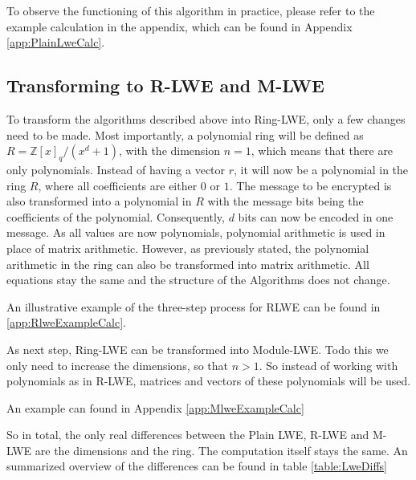 To observe the functioning of this algorithm in practice, please refer to the example calculation in the appendix, which can be found in Appendix \ref{app:PlainLweCalc}.

\subsection*{Transforming to R-LWE and M-LWE}

To transform the algorithms described above into Ring-LWE, only a few changes need to be made. Most importantly, a polynomial ring will be defined as $R = \mathbb{Z}[x]_q/(x^d+1)$, with the dimension $n=1$, which means that there are only polynomials. Instead of having a vector $r$, it will now be a polynomial in the ring $R$, where all coefficients are either $0$ or $1$. The message to be encrypted is also transformed into a polynomial in $R$ with the message bits being the coefficients of the polynomial. Consequently, $d$ bits can now be encoded in one message. As all values are now polynomials, polynomial arithmetic is used in place of matrix arithmetic. However, as previously stated, the polynomial arithmetic in the ring can also be transformed into matrix arithmetic. All equations stay the same and the structure of the Algorithms does not change.

An illustrative example of the three-step process for RLWE can be found in \ref{app:RlweExampleCalc}.


As next step, Ring-LWE can be transformed into Module-LWE. Todo this we only need to increase the dimensions, so that $n>1$. So instead of working with polynomials as in R-LWE, matrices and vectors of these polynomials will be used.

An example can found in Appendix \ref{app:MlweExampleCalc}

So in total, the only real differences between the Plain LWE, R-LWE and M-LWE are the dimensions and the ring. The computation itself stays the same. An summarized overview of the differences can be found in table \ref{table:LweDiffs}

